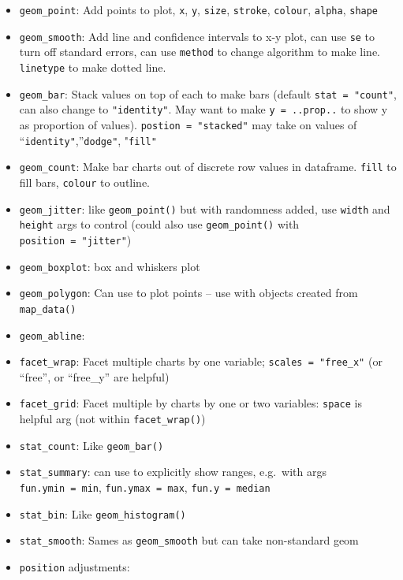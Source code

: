 \documentclass[]{book}
\providecommand{\tightlist}{%
  \setlength{\itemsep}{0pt}\setlength{\parskip}{0pt}}
\theoremstyle{definition}
\theoremstyle{definition}
\theoremstyle{definition}
\theoremstyle{remark}
\begin{document}
\begin{itemize}
\tightlist
\item
  \texttt{geom\_point}: Add points to plot, \texttt{x}, \texttt{y},
  \texttt{size}, \texttt{stroke}, \texttt{colour}, \texttt{alpha},
  \texttt{shape}
\item
  \texttt{geom\_smooth}: Add line and confidence intervals to x-y plot,
  can use \texttt{se} to turn off standard errors, can use
  \texttt{method} to change algorithm to make line. \texttt{linetype} to
  make dotted line.
\item
  \texttt{geom\_bar}: Stack values on top of each to make bars (default
  \texttt{stat\ =\ "count"}, can also change to \texttt{"identity"}. May
  want to make \texttt{y\ =\ ..prop..} to show y as proportion of
  values). \texttt{postion\ =\ "stacked"} may take on values of
  ``\texttt{identity"},''\texttt{dodge"}, "\texttt{fill"}
\item
  \texttt{geom\_count}: Make bar charts out of discrete row values in
  dataframe. \texttt{fill} to fill bars, \texttt{colour} to outline.
\item
  \texttt{geom\_jitter}: like \texttt{geom\_point()} but with randomness
  added, use \texttt{width} and \texttt{height} args to control (could
  also use \texttt{geom\_point()} with \texttt{position\ =\ "jitter"})
\item
  \texttt{geom\_boxplot}: box and whiskers plot
\item
  \texttt{geom\_polygon}: Can use to plot points -- use with objects
  created from \texttt{map\_data()}
\item
  \texttt{geom\_abline}:
\item
  \texttt{facet\_wrap}: Facet multiple charts by one variable;
  \texttt{scales\ =\ "free\_x"} (or ``free'', or ``free\_y'' are
  helpful)
\item
  \texttt{facet\_grid}: Facet multiple by charts by one or two
  variables: \texttt{space} is helpful arg (not within
  \texttt{facet\_wrap()})
\item
  \texttt{stat\_count}: Like \texttt{geom\_bar()}
\item
  \texttt{stat\_summary}: can use to explicitly show ranges, e.g.~with
  args \texttt{fun.ymin\ =\ min}, \texttt{fun.ymax\ =\ max},
  \texttt{fun.y\ =\ median}
\item
  \texttt{stat\_bin}: Like \texttt{geom\_histogram()}
\item
  \texttt{stat\_smooth}: Sames as \texttt{geom\_smooth} but can take
  non-standard geom
\item
  \texttt{position} adjustments:


\end{itemize}
\end{document}
